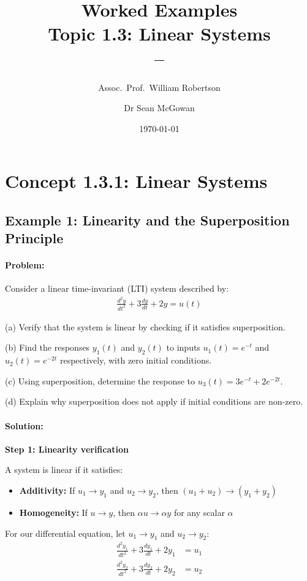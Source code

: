 \documentclass[11pt,a4paper]{article}
\title{\textbf{Worked Examples}\\[0.5em]
\large Topic 1.3: Linear Systems\\[0.3em]
\normalsize \coursesubtitle{} -- \coursetitle}
\author{Assoc.\ Prof.\ William Robertson \and Dr Sean McGowan}
\date{\today}
\begin{document}
\maketitle
\tableofcontents
\newpage

\section{Concept 1.3.1: Linear Systems}

\subsection{Example 1: Linearity and the Superposition Principle}

\paragraph{Problem:} Consider a linear time-invariant (LTI) system described by:
\begin{align}
\frac{d^2y}{dt^2} + 3\frac{dy}{dt} + 2y = u(t)
\end{align}

(a) Verify that the system is linear by checking if it satisfies superposition.

(b) Find the responses $y_1(t)$ and $y_2(t)$ to inputs $u_1(t) = e^{-t}$ and $u_2(t) = e^{-2t}$ respectively, with zero initial conditions.

(c) Using superposition, determine the response to $u_3(t) = 3e^{-t} + 2e^{-2t}$.

(d) Explain why superposition does not apply if initial conditions are non-zero.

\paragraph{Solution:}

\textbf{Step 1: Linearity verification}

A system is linear if it satisfies:
\begin{itemize}
\item \textbf{Additivity:} If $u_1 \to y_1$ and $u_2 \to y_2$, then $(u_1 + u_2) \to (y_1 + y_2)$
\item \textbf{Homogeneity:} If $u \to y$, then $\alpha u \to \alpha y$ for any scalar $\alpha$
\end{itemize}

For our differential equation, let $u_1 \to y_1$ and $u_2 \to y_2$:
\begin{align}
\frac{d^2y_1}{dt^2} + 3\frac{dy_1}{dt} + 2y_1 &= u_1 \\
\frac{d^2y_2}{dt^2} + 3\frac{dy_2}{dt} + 2y_2 &= u_2
\end{align}
\end{document}
